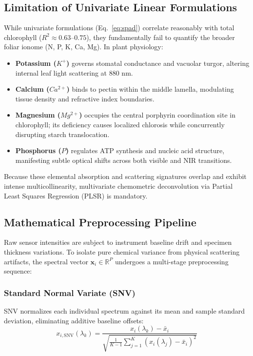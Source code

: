 \documentclass[9pt,twocolumn,a4paper,landscape]{article}
\begin{document}
\subsection{Limitation of Univariate Linear Formulations}
While univariate formulations (Eq.~\ref{eq:spad}) correlate reasonably with total chlorophyll ($R^2 \approx 0.63\text{--}0.75$), they fundamentally fail to quantify the broader foliar ionome (N, P, K, Ca, Mg). In plant physiology:
\begin{itemize}[leftmargin=*]
    \item \textbf{Potassium ($K^+$)} governs stomatal conductance and vacuolar turgor, altering internal leaf light scattering at $880\text{ nm}$.
    \item \textbf{Calcium ($Ca^{2+}$)} binds to pectin within the middle lamella, modulating tissue density and refractive index boundaries.
    \item \textbf{Magnesium ($Mg^{2+}$)} occupies the central porphyrin coordination site in chlorophyll; its deficiency causes localized chlorosis while concurrently disrupting starch translocation.
    \item \textbf{Phosphorus ($P$)} regulates ATP synthesis and nucleic acid structure, manifesting subtle optical shifts across both visible and NIR transitions.
\end{itemize}
Because these elemental absorption and scattering signatures overlap and exhibit intense multicollinearity, multivariate chemometric deconvolution via Partial Least Squares Regression (PLSR) is mandatory.

\subsection{Mathematical Preprocessing Pipeline}
Raw sensor intensities are subject to instrument baseline drift and specimen thickness variations. To isolate pure chemical variance from physical scattering artifacts, the spectral vector $\mathbf{x}_i \in \mathbb{R}^{P}$ undergoes a multi-stage preprocessing sequence:

\subsubsection{Standard Normal Variate (SNV)}
SNV normalizes each individual spectrum against its mean and sample standard deviation, eliminating additive baseline offsets:
\begin{equation}
    x_{i, \text{SNV}}(\lambda_k) = \frac{x_i(\lambda_k) - \bar{x}_i}{\sqrt{\frac{1}{K-1} \sum_{j=1}^{K} (x_i(\lambda_j) - \bar{x}_i)^2}}
    \label{eq:snv}
\end{equation}
\end{document}
